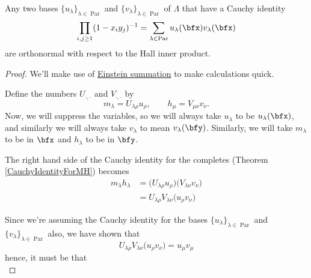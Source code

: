 \documentclass{article}
\DeclareMathOperator{\Par}{Par}
\begin{document}
\begin{theorem}\label{thm:CauchyIdentityImpliesOrthonormal}
    Any two bases $\{u_\lambda\}_{\lambda\in\Par}$ and $\{v_\lambda\}_{\lambda\in\Par}$ of $\Lambda$ that have a Cauchy identity
    \begin{equation}\label{eq:CauchyIdentityArbitrary}
        \prod_{i,j \geq 1}(1 - x_iy_j)^{-1}
        =
        \sum_{\lambda\in\Par}
        u_\lambda(\bfx) v_\lambda(\bfx)
    \end{equation}
    are orthonormal with respect to the Hall inner product.
\end{theorem}

\begin{proof}
    We'll make use of \href{https://en.wikipedia.org/wiki/Einstein_notation}{Einstein summation} to make calculations quick.

    Define the numbers $U_{\cdot,\cdot}$ and $V_{\cdot,\cdot}$ by
    \[
        m_\lambda = U_{\lambda\rho} u_\rho, \qquad h_\mu = V_{\mu\nu} v_\nu.
    \]
    Now, we will suppress the variables, so we will always take $u_\lambda$ to be $u_\lambda(\bfx)$, and similarly we will always take $v_\lambda$ to mean $v_\lambda(\bfy)$.
    Similarly, we will take $m_\lambda$ to be in $\bfx$ and $h_\lambda$ to be in $\bfy$.

    The right hand side of the Cauchy identity for the completes (Theorem \ref{CauchyIdentityForMH}) becomes
    \begin{align*}
        m_\lambda h_\lambda &= \Big(U_{\lambda\rho}u_\rho\Big)\Big(V_{\lambda\nu}v_\nu\Big) \\
                                                                                &= U_{\lambda\rho}V_{\lambda\nu} \Big(u_\rho v_\nu\Big)
    \end{align*}

    Since we're assuming the Cauchy identity for the bases $\{u_\lambda\}_{\lambda\in\Par}$ and $\{v_\lambda\}_{\lambda\in\Par}$ also, we have shown that
    \[
        U_{\lambda\rho}V_{\lambda\nu} \Big(u_\rho v_\nu\Big) = u_\mu v_\mu
    \]
    hence, it must be that
    \[
    \]
\end{proof}
\end{document}
